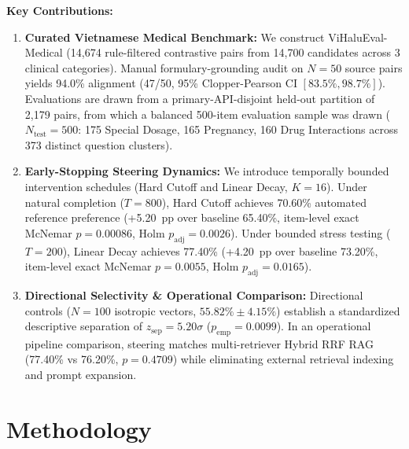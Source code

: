 \documentclass[runningheads]{llncs}
\begin{document}
\noindent\textbf{Key Contributions:}
\begin{enumerate}
    \item \textbf{Curated Vietnamese Medical Benchmark:} We construct ViHaluEval-Medical (14,674 rule-filtered contrastive pairs from 14,700 candidates across 3 clinical categories). Manual formulary-grounding audit on $N=50$ source pairs yields 94.0\% alignment (47/50, 95\% Clopper-Pearson CI $[83.5\%, 98.7\%]$). Evaluations are drawn from a primary-API-disjoint held-out partition of 2,179 pairs, from which a balanced 500-item evaluation sample was drawn ($N_{\text{test}}=500$: 175 Special Dosage, 165 Pregnancy, 160 Drug Interactions across 373 distinct question clusters).
    \item \textbf{Early-Stopping Steering Dynamics:} We introduce temporally bounded intervention schedules (Hard Cutoff and Linear Decay, $K=16$). Under natural completion ($T=800$), Hard Cutoff achieves 70.60\% automated reference preference (+5.20~pp over baseline 65.40\%, item-level exact McNemar $p=0.00086$, Holm $p_{\text{adj}}=0.0026$). Under bounded stress testing ($T=200$), Linear Decay achieves 77.40\% (+4.20~pp over baseline 73.20\%, item-level exact McNemar $p=0.0055$, Holm $p_{\text{adj}}=0.0165$).
    \item \textbf{Directional Selectivity \& Operational Comparison:} Directional controls ($N=100$ isotropic vectors, $55.82\% \pm 4.15\%$) establish a standardized descriptive separation of $z_{\text{sep}}=5.20\sigma$ ($p_{\text{emp}}=0.0099$). In an operational pipeline comparison, steering matches multi-retriever Hybrid RRF RAG (77.40\% vs 76.20\%, $p=0.4709$) while eliminating external retrieval indexing and prompt expansion.
\end{enumerate}

\section{Methodology}\label{sec:methodology}
\end{document}
